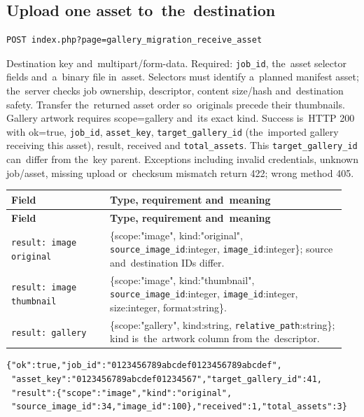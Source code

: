 \documentclass[11pt,a4paper]{article}
\newcommand{\codeword}[1]{\nolinkurl{#1}}
\begin{document}
\subsection{\texorpdfstring{Upload one asset to~the~destination}{Upload one asset to the destination}}

\label{api352:migration-receive-asset}

\begin{lstlisting}[language={}]
POST index.php?page=gallery_migration_receive_asset
\end{lstlisting}

Destination key and~multipart/form-data. Required: \codeword{job_id}, the~asset selector
fields and~a~binary file in~asset. Selectors must identify a~planned manifest asset;
the~server checks job ownership, descriptor, content size/hash and~destination safety.
Transfer the~returned asset order so~originals precede their thumbnails. Gallery artwork
requires scope=gallery and~its exact kind. Success is~HTTP 200 with ok=true,
\codeword{job_id}, \codeword{asset_key}, \codeword{target_gallery_id} (the~imported gallery
receiving this asset), result, received and \codeword{total_assets}. This
\codeword{target_gallery_id} can~differ from the~key parent. Exceptions including invalid
credentials, unknown job/asset, missing upload or~checksum mismatch return 422; wrong method
405.

\begin{longtable}{@{}>{\RaggedRight\arraybackslash}p{0.28\linewidth}>{\RaggedRight\arraybackslash}p{0.67\linewidth}@{}}
\toprule
\textbf{Field} & \textbf{Type, requirement and~meaning} \\
\midrule
\endfirsthead
\toprule
\textbf{Field} & \textbf{Type, requirement and~meaning} \\
\midrule
\endhead
\bottomrule
\endfoot
\codeword{result: image original} & \{scope:"image", kind:"original",
\codeword{source_image_id}:integer, \codeword{image_id}:integer\}; source and~destination
IDs differ. \\
\codeword{result: image thumbnail} & \{scope:"image", kind:"thumbnail",
\codeword{source_image_id}:integer, \codeword{image_id}:integer, size:integer,
format:string\}. \\
\codeword{result: gallery} & \{scope:"gallery", kind:string,
\codeword{relative_path}:string\}; kind is~the~artwork column from the~descriptor. \\
\end{longtable}

\begin{lstlisting}[language={}]
{"ok":true,"job_id":"0123456789abcdef0123456789abcdef",
 "asset_key":"0123456789abcdef01234567","target_gallery_id":41,
 "result":{"scope":"image","kind":"original",
 "source_image_id":34,"image_id":100},"received":1,"total_assets":3}
\end{lstlisting}
\end{document}
